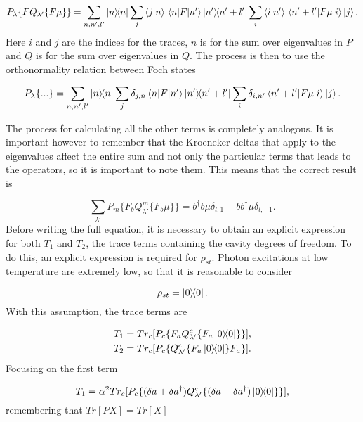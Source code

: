 \documentclass[12pt]{article}
\begin{document}
\begin{equation*}
    P_{\lambda}\{F Q_{\lambda'}\{F\mu\}\} = \sum_{n,n',l'} \ketbra{n}{n} \sum_{j} \braket{j}{n}\mel{n}{F}{n'}\ketbra{n'}{n'+l'}\sum_{i} \braket{i}{n'}\mel{n'+l'}{F\mu}{i}\ket{j}.
\end{equation*} Here $i$ and $j$ are the indices for the traces, $n$ is for the sum over eigenvalues in $P$ and $Q$ is for the sum over eigenvalues in $Q$. The process is then to use the orthonormality relation between Foch states

\begin{align*}
    P_{\lambda}\{...\} = \sum_{n,n',l'} \ketbra{n}{n} \sum_{j} \delta_{j,n}\mel{n}{F}{n'}\ketbra{n'}{n'+l'}\sum_{i} \delta_{i,n'}\mel{n'+l'}{F\mu}{i}\ket{j}.
\end{align*}

The process for calculating all the other terms is completely analogous. It is important however to remember that the Kroeneker deltas that apply to the eigenvalues affect the entire sum and not only the particular terms that leads to the operators, so it is important to note them. This means that the correct result is

\begin{equation}
    \sum_{\lambda'}  P_m\{F_b Q^m_{\lambda'}\{F_b\mu\}\}= b^\dagger b \mu\delta_{l,1}+ bb^\dagger \mu\delta_{l,-1}.
\end{equation} Before writing the full equation, it is necessary to obtain an explicit expression for both $T_1$ and $T_2$, the trace terms containing the cavity degrees of freedom. To do this, an explicit expression is required for $\rho_{st}$. Photon excitations at low temperature are extremely low, so that it is reasonable to consider

\begin{equation}
    \rho_{st} = \ketbra{0}{0}.
\end{equation} With this assumption, the trace terms are

\begin{align}
    T_1 &= Tr_c[P_c\{F_a Q^c_{\lambda'}\{F_a\ketbra{0}{0}\}\}],\\
    T_2 &= Tr_c[P_c\{Q^c_{\lambda'}\{F_a \ketbra{0}{0}\}F_a \}].
\end{align} Focusing on the first term

\begin{equation}
    T_1 = \alpha^2 Tr_c[P_c\{(\delta a + \delta a^\dagger)Q^c_{\lambda'}\{(\delta a + \delta a^\dagger)\ketbra{0}{0}\}\}],
\end{equation}  remembering that $Tr[PX] = Tr[X]$
\end{document}
